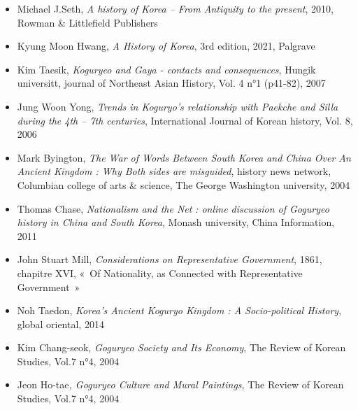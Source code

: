 \documentclass[11pt,a4paper]{article}
\begin{document}
\begin{itemize}[leftmargin=1.3em,itemsep=.18em,topsep=.25em]
\item
  Michael J.Seth, \emph{A history of Korea -- From Antiquity to the present}, 2010, Rowman \& Littlefield Publishers
\item
  Kyung Moon Hwang, \emph{A History of Korea}, 3rd edition, 2021, Palgrave
\item
  Kim Taesik, \emph{Koguryeo and Gaya - contacts and consequences}, Hungik universitt, journal of Northeast Asian History, Vol. 4 n°1 (p41-82), 2007
\item
  Jung Woon Yong, \emph{Trends in Koguryo's relationship with Paekche and Silla during the 4th -- 7th centuries}, International Journal of Korean history, Vol. 8, 2006
\item
  Mark Byington, \emph{The War of Words Between South Korea and China Over An Ancient Kingdom : Why Both sides are misguided}, history news network, Columbian college of arts \& science, The George Washington university, 2004
\item
  Thomas Chase, \emph{Nationalism and the Net} \emph{: online discussion of Goguryeo history in China and South Korea}, Monash university, China Information, 2011
\item
  John Stuart Mill, \emph{Considerations on Representative Government}, 1861, chapitre XVI, «~Of Nationality, as Connected with Representative Government~»
\item
  Noh Taedon, \emph{Korea's Ancient Koguryo Kingdom : A Socio-political History}, global oriental, 2014
\item
  Kim Chang-seok, \emph{Goguryeo Society and Its Economy}, The Review of Korean Studies, Vol.7 n°4, 2004
\item
  Jeon Ho-tae\emph{, Goguryeo Culture and Mural Paintings}, The Review of Korean Studies, Vol.7 n°4, 2004
\end{itemize}
\end{document}
